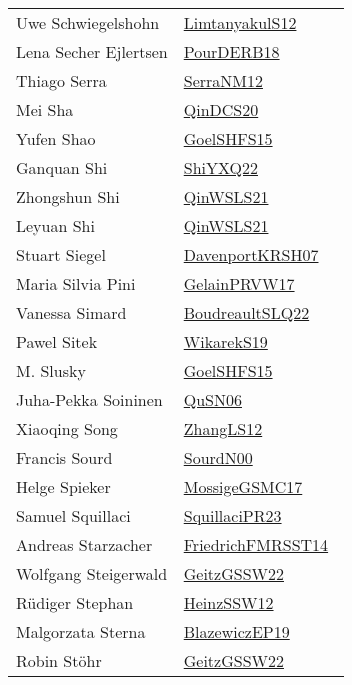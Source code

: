 {\begin{longtable}{p{4cm}p{20cm}}
Uwe Schwiegelshohn & \href{works/LimtanyakulS12.pdf}{LimtanyakulS12}~\cite{LimtanyakulS12}\\
Lena Secher Ejlertsen & \href{works/PourDERB18.pdf}{PourDERB18}~\cite{PourDERB18}\\
Thiago Serra & \href{works/SerraNM12.pdf}{SerraNM12}~\cite{SerraNM12}\\
Mei Sha & \href{works/QinDCS20.pdf}{QinDCS20}~\cite{QinDCS20}\\
Yufen Shao & \href{works/GoelSHFS15.pdf}{GoelSHFS15}~\cite{GoelSHFS15}\\
Ganquan Shi & \href{}{ShiYXQ22}~\cite{ShiYXQ22}\\
Zhongshun Shi & \href{works/QinWSLS21.pdf}{QinWSLS21}~\cite{QinWSLS21}\\
Leyuan Shi & \href{works/QinWSLS21.pdf}{QinWSLS21}~\cite{QinWSLS21}\\
Stuart Siegel & \href{works/DavenportKRSH07.pdf}{DavenportKRSH07}~\cite{DavenportKRSH07}\\
Maria Silvia Pini & \href{works/GelainPRVW17.pdf}{GelainPRVW17}~\cite{GelainPRVW17}\\
Vanessa Simard & \href{works/BoudreaultSLQ22.pdf}{BoudreaultSLQ22}~\cite{BoudreaultSLQ22}\\
Pawel Sitek & \href{works/WikarekS19.pdf}{WikarekS19}~\cite{WikarekS19}\\
M. Slusky & \href{works/GoelSHFS15.pdf}{GoelSHFS15}~\cite{GoelSHFS15}\\
Juha{-}Pekka Soininen & \href{works/QuSN06.pdf}{QuSN06}~\cite{QuSN06}\\
Xiaoqing Song & \href{works/ZhangLS12.pdf}{ZhangLS12}~\cite{ZhangLS12}\\
Francis Sourd & \href{}{SourdN00}~\cite{SourdN00}\\
Helge Spieker & \href{works/MossigeGSMC17.pdf}{MossigeGSMC17}~\cite{MossigeGSMC17}\\
Samuel Squillaci & \href{works/SquillaciPR23.pdf}{SquillaciPR23}~\cite{SquillaciPR23}\\
Andreas Starzacher & \href{}{FriedrichFMRSST14}~\cite{FriedrichFMRSST14}\\
Wolfgang Steigerwald & \href{works/GeitzGSSW22.pdf}{GeitzGSSW22}~\cite{GeitzGSSW22}\\
R{\"{u}}diger Stephan & \href{works/HeinzSSW12.pdf}{HeinzSSW12}~\cite{HeinzSSW12}\\
Malgorzata Sterna & \href{}{BlazewiczEP19}~\cite{BlazewiczEP19}\\
Robin St{\"{o}}hr & \href{works/GeitzGSSW22.pdf}{GeitzGSSW22}~\cite{GeitzGSSW22}\\

\end{longtable}}
